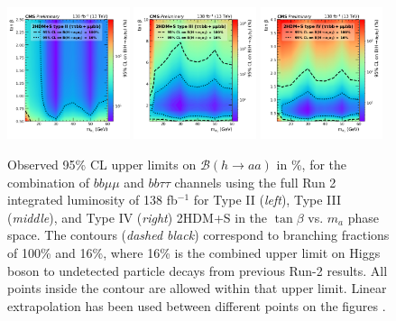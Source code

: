 \begin{figure}[h]
    \begin{center}
      \includegraphics[width=0.32\textwidth]{figures/ch-10-results/HAA_comb_II_prelim.pdf}
      \includegraphics[width=0.32\textwidth]{figures/ch-10-results/HAA_comb_III_prelim.pdf}
      \includegraphics[width=0.32\textwidth]{figures/ch-10-results/HAA_comb_IV_prelim.pdf}
    \end{center}
    \caption[Observed 95\% CL upper limits on $\mathcal{B}(h\to aa)$ in \%, for the combination of $bb\mu\mu$ and $bb\tau\tau$ channels using the full Run 2 integrated luminosity of 138 fb$^{-1}$ for Type II (\textit{left}), Type III (\textit{middle}), and Type IV (\textit{right}) 2HDM+S in the $\tan\beta$ vs. $m_a$ phase space.]{Observed 95\% CL upper limits on $\mathcal{B}(h\to aa)$ in \%, for the combination of $bb\mu\mu$ and $bb\tau\tau$ channels using the full Run 2 integrated luminosity of 138 fb$^{-1}$ for Type II (\textit{left}), Type III (\textit{middle}), and Type IV (\textit{right}) 2HDM+S in the $\tan\beta$ vs. $m_a$ phase space. The contours (\textit{dashed black}) correspond to branching fractions of 100\% and 16\%, where 16\% is the combined upper limit on Higgs boson to undetected particle decays from previous Run-2 results. All points inside the contour are allowed within that upper limit. Linear extrapolation has been used between different points on the figures \cite{CMS-AN-20-213}.}
      \label{fig:results_limits_combined_2D}
  \end{figure}
  
